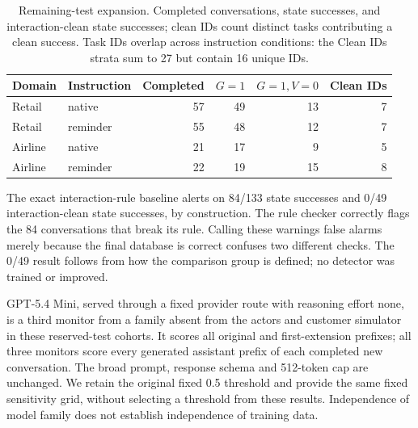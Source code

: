 \begin{table}[t]\centering\small
\caption{Remaining-test expansion. Completed conversations, state successes, and interaction-clean state successes; clean IDs count distinct tasks contributing a clean success. Task IDs overlap across instruction conditions: the Clean IDs strata sum to 27 but contain 16 unique IDs.}\label{tab:replication-cohort}
\begin{tabular}{llrrrr}
\toprule
Domain & Instruction & Completed & $G=1$ & $G=1,V=0$ & Clean IDs\\
\midrule
Retail & native & 57 & 49 & 13 & 7\\
Retail & reminder & 55 & 48 & 12 & 7\\
Airline & native & 21 & 17 & 9 & 5\\
Airline & reminder & 22 & 19 & 15 & 8\\
\bottomrule
\end{tabular}
\end{table}
The exact interaction-rule baseline alerts on 84/133 state successes and 0/49 interaction-clean state successes, by construction. The rule checker correctly flags the 84 conversations that break its rule. Calling these warnings false alarms merely because the final database is correct confuses two different checks. The 0/49 result follows from how the comparison group is defined; no detector was trained or improved.

GPT-5.4 Mini, served through a fixed provider route with reasoning effort none, is a third monitor from a family absent from the actors and customer simulator in these reserved-test cohorts. It scores all original and first-extension prefixes; all three monitors score every generated assistant prefix of each completed new conversation. The broad prompt, response schema and 512-token cap are unchanged. We retain the original fixed 0.5 threshold and provide the same fixed sensitivity grid, without selecting a threshold from these results. Independence of model family does not establish independence of training data.

